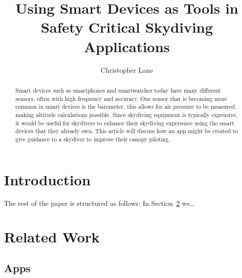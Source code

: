 \documentclass[11pt, a4paper, twocolumn]{article}
\title{Using Smart Devices as Tools in Safety Critical Skydiving Applications}
\author{Christopher Lane}
\begin{document}
\maketitle

\begin{abstract} %
    Smart devices such as smartphones and smartwatches today have many different sensors, often with high frequency and accuracy. One sensor that is becoming more common in smart devices is the barometer, this allows for air pressure to be measured, making altitude calculations possible. Since skydiving equipment is typically expensive, it would be useful for skydivers to enhance their skydiving experience using the smart devices that they already own. This article will discuss how an app might be created to give guidance to a skydiver to improve their canopy piloting.
\end{abstract}

\section{Introduction}\label{sec:introduction} %







The rest of the paper is structured as follows: In Section~\ref{sec:related-work} we\dots


\section{Related Work}\label{sec:related-work}
\subsection{Apps}\label{sec:apps} %
\end{document}
